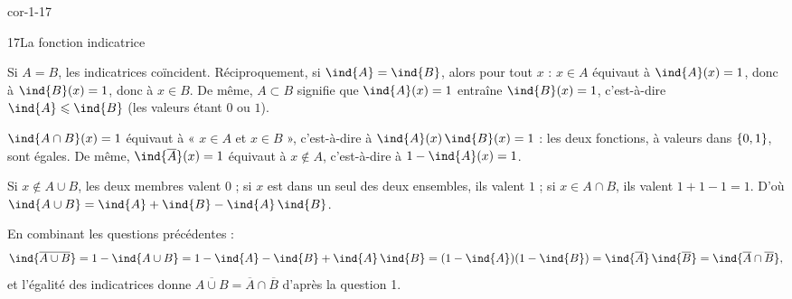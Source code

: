 \begin{blocLivre}{cor-1-17}
\begin{corrige}{17}{La fonction indicatrice}
\begin{questions}
  \item Si $A=B$, les indicatrices coïncident. Réciproquement, si $\ind{A}=\ind{B}$, alors pour tout
    $x$ : $x\in A$ équivaut à $\ind{A}(x)=1$, donc à $\ind{B}(x)=1$, donc à $x\in B$.
    De même, $A\subset B$ signifie que $\ind{A}(x)=1$ entraîne $\ind{B}(x)=1$, c'est-à-dire
    $\ind{A}\leq\ind{B}$ (les valeurs étant $0$ ou $1$).
  \item $\ind{A\cap B}(x)=1$ équivaut à « $x\in A$ et $x\in B$ », c'est-à-dire à
    $\ind{A}(x)\,\ind{B}(x)=1$ : les deux fonctions, à valeurs dans $\left\{0,1\right\}$, sont égales.
    De même, $\ind{\overline{A}}(x)=1$ équivaut à $x\notin A$, c'est-à-dire à $1-\ind{A}(x)=1$.
  \item {}\enspace Si $x\notin A\cup B$, les deux membres valent $0$ ;
    si $x$ est dans un seul des deux ensembles, ils valent $1$ ; si $x\in A\cap B$, ils valent
    $1+1-1=1$. D'où $\ind{A\cup B}=\ind{A}+\ind{B}-\ind{A}\,\ind{B}$.
  \item En combinant les questions précédentes :
    \[\ind{\overline{A\cup B}}=1-\ind{A\cup B}=1-\ind{A}-\ind{B}+\ind{A}\,\ind{B}
      =(1-\ind{A})(1-\ind{B})=\ind{\overline{A}}\,\ind{\overline{B}}=\ind{\overline{A}\cap\overline{B}},\]
    et l'égalité des indicatrices donne $\overline{A\cup B}=\overline{A}\cap\overline{B}$ d'après la
    question 1.
\end{questions}
\end{corrige}
\end{blocLivre}


